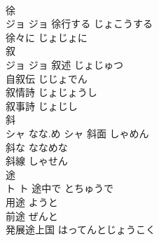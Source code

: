 \documentclass[8pt]{extreport}
\begin{document}
\begin{CJK}{UTF8}{min}
\\	徐	
\\	ジョ		ジョ	徐行する	じょこうする	
\\	徐々に	じょじょに	
\\	叙	
\\	ジョ		ジョ	叙述	じょじゅつ	
\\	自叙伝	じじょでん	
\\	叙情詩	じょじょうし	
\\	叙事詩	じょじし	
\\	斜	
\\	シャ	なな.め	シャ	斜面	しゃめん	
\\	斜な	ななめな	
\\	斜線	しゃせん	
\\	途	
\\	ト		ト	途中で	とちゅうで	
\\	用途	ようと	
\\	前途	ぜんと	
\\	発展途上国	はってんとじょうこく	
\end{CJK}
\end{document}
